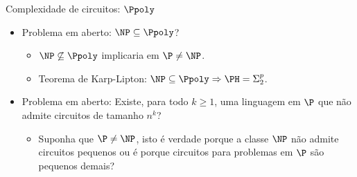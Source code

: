 \documentclass[landscape]{beamer}
\begin{document}
\begin{frame} {Complexidade de circuitos: $\Ppoly$}

\begin{itemize}

	\item Problema em aberto: $\NP \subseteq \Ppoly$?
	
	\begin{itemize}
	
		\item $\NP \not\subseteq \Ppoly$ implicaria em $\P \neq \NP$.
		
		\item Teorema de Karp-Lipton: $\NP \subseteq \Ppoly \Rightarrow \PH = \Sigma_{2}^{p}$.
	
	\end{itemize}
	
	\item Problema em aberto: Existe, para todo $k \geq 1$, uma linguagem em $\P$ que não admite circuitos de tamanho $n^{k}$?
	
	\begin{itemize}
	
		\item Suponha que $\P \neq \NP$, isto é verdade porque a classe $\NP$ não admite circuitos pequenos ou é porque circuitos para problemas em $\P$ são pequenos demais?
	
	\end{itemize}

\end{itemize}

\end{frame}

\end{document}
